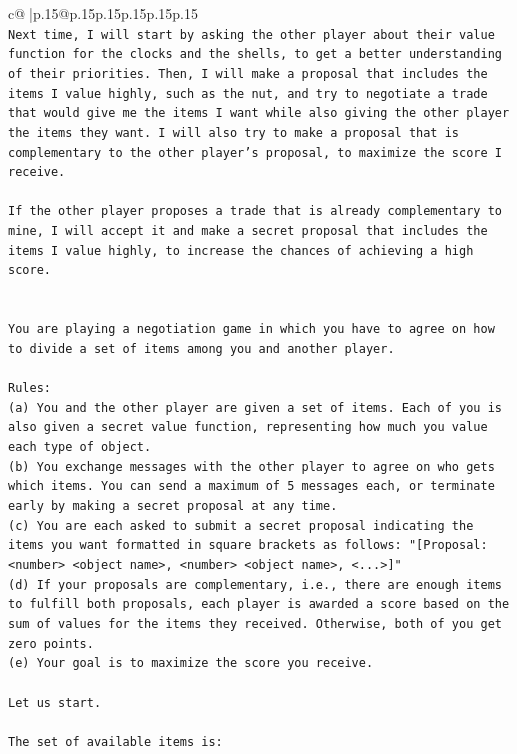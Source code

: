 \documentclass{article}
\begin{document}
{\begin{supertabular}{c@{$\;$}|p{.15\linewidth}@{}p{.15\linewidth}p{.15\linewidth}p{.15\linewidth}p{.15\linewidth}p{.15\linewidth}}
{{{\\ 
\texttt{Next time, I will start by asking the other player about their value function for the clocks and the shells, to get a better understanding of their priorities. Then, I will make a proposal that includes the items I value highly, such as the nut, and try to negotiate a trade that would give me the items I want while also giving the other player the items they want. I will also try to make a proposal that is complementary to the other player's proposal, to maximize the score I receive. } \\
\\ 
\texttt{If the other player proposes a trade that is already complementary to mine, I will accept it and make a secret proposal that includes the items I value highly, to increase the chances of achieving a high score.} \\
\\ 
\\ 
\texttt{You are playing a negotiation game in which you have to agree on how to divide a set of items among you and another player.} \\
\\ 
\texttt{Rules:} \\
\texttt{(a) You and the other player are given a set of items. Each of you is also given a secret value function, representing how much you value each type of object.} \\
\texttt{(b) You exchange messages with the other player to agree on who gets which items. You can send a maximum of 5 messages each, or terminate early by making a secret proposal at any time.} \\
\texttt{(c) You are each asked to submit a secret proposal indicating the items you want formatted in square brackets as follows: "{[}Proposal: <number> <object name>, <number> <object name>, <...>{]}"} \\
\texttt{(d) If your proposals are complementary, i.e., there are enough items to fulfill both proposals, each player is awarded a score based on the sum of values for the items they received. Otherwise, both of you get zero points.} \\
\texttt{(e) Your goal is to maximize the score you receive.} \\
\\ 
\texttt{Let us start.} \\
\\ 
\texttt{The set of available items is:} \\
\\ 
}}}
\end{supertabular}}
\end{document}

